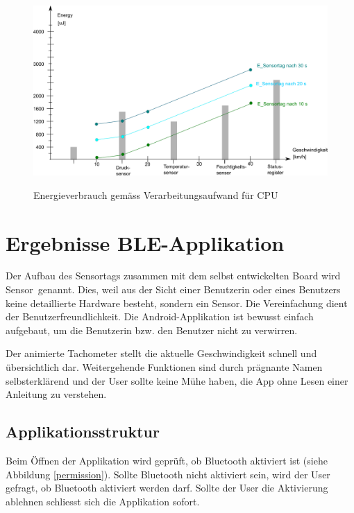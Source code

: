 \begin{figure}[ht]
\includegraphics[width=1\textwidth]{4Resultate/imag/EnergyVerbrauchZusammenfassung.png}\label{resultat_Zsm_Energy} 
\caption{Energieverbrauch gem\"{a}ss Verarbeitungsaufwand für CPU}
\end{figure}


\section{Ergebnisse BLE-Applikation}

Der Aufbau des Sensortags zusammen mit dem selbst entwickelten Board wird \glqq Sensor\grqq\thinspace\ genannt. Dies, weil aus der Sicht einer Benutzerin oder eines Benutzers keine detaillierte Hardware besteht, sondern \glqq ein Sensor\grqq. Die Vereinfachung dient der Benutzerfreundlichkeit. Die Android-Applikation ist bewusst einfach aufgebaut, um die Benutzerin bzw. den Benutzer nicht zu verwirren. 

Der animierte Tachometer stellt die aktuelle Geschwindigkeit schnell und übersichtlich dar. Weitergehende Funktionen sind durch prägnante Namen selbsterklärend und der User sollte keine Mühe haben, die App ohne Lesen einer Anleitung zu verstehen.

\subsection{Applikationsstruktur}

Beim Öffnen der Applikation wird geprüft, ob Bluetooth aktiviert ist (siehe Abbildung \ref{permission}). Sollte Bluetooth nicht aktiviert sein, wird der User gefragt, ob Bluetooth aktiviert werden darf. Sollte der User die Aktivierung ablehnen schliesst sich die Applikation sofort.


